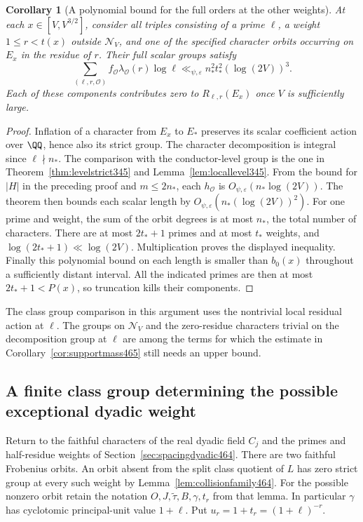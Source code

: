 \documentclass[a4paper,11pt]{article}
\newtheorem{corollary}[proposition]{Corollary}
\theoremstyle{definition}
\theoremstyle{remark}
\numberwithin{equation}{section}
\begin{document}
\begin{corollary}[A polynomial bound for the full orders at the other weights]\leavevmode
\label{cor:fullnonsplit466}
At each \(x\in[V,V^{3/2}]\), consider all triples consisting of
a prime \(\ell\), a weight \(1\le r<t(x)\) outside
\(\mathcal N_V\), and one of the specified character orbits
occurring on \(E_x\) in the residue of \(r\). Their full scalar
groups satisfy
\[
   \sum_{(\ell,r,\mathcal O)}
       f_{\mathcal O}\lambda_{\mathcal O}(r)\log\ell
            \ll_{\psi,\varepsilon}
                  n_*^2t_*^2(\log(2V))^3 .
\]
Each of these components contributes zero to \(R_{\ell,r}(E_x)\)
once \(V\) is sufficiently large.
\end{corollary}
\begin{proof}
Inflation of a character from \(E_x\) to \(E_*\) preserves its
scalar coefficient action over \(\QQ\), hence also its strict
group. The character decomposition is integral since
\(\ell\nmid n_*\). The comparison with the conductor-level group
is the one in Theorem~\ref{thm:levelstrict345} and
Lemma~\ref{lem:locallevel345}. From the bound for \(|H|\) in
the preceding proof and \(m\le2n_*\), each \(h_{\mathcal O}\)
is \(O_{\psi,\varepsilon}(n_*\log(2V))\). The theorem then
bounds each scalar length by
\(O_{\psi,\varepsilon}(n_*(\log(2V))^2)\).
For one prime and weight, the sum of the orbit degrees is at
most \(n_*\), the total number of characters. There are at most
\(2t_*+1\) primes and at most \(t_*\) weights, and
\(\log(2t_*+1)\ll\log(2V)\). Multiplication proves the
displayed inequality. Finally this polynomial bound on each
length is smaller than \(b_0(x)\) throughout a sufficiently
distant interval. All the indicated primes are then at most
\(2t_*+1<P(x)\), so truncation kills their components.
\end{proof}

The class group comparison in this argument uses the nontrivial
local residual action at \(\ell\). The groups on
\(\mathcal N_V\) and the zero-residue characters trivial on the
decomposition group at \(\ell\) are among the terms for which the
estimate in Corollary~\ref{cor:supportmass465} still needs an
upper bound.


\subsection{A finite class group determining the possible exceptional dyadic weight}
\label{sec:finiteexception467}

Return to the faithful characters of the real dyadic field \(C_j\)
and the primes and half-residue weights of
Section~\ref{sec:spacingdyadic464}. There are two faithful
Frobenius orbits. An orbit absent from the split class quotient
of \(L\) has zero strict group at every such weight by
Lemma~\ref{lem:collisionfamily464}. For the possible nonzero
orbit retain the notation \(O,J,\widetilde\tau,B,\gamma,t_r\)
from that lemma. In particular \(\gamma\) has cyclotomic
principal-unit value \(1+\ell\). Put \(u_r=1+t_r=(1+\ell)^{-r}\).
\end{document}
